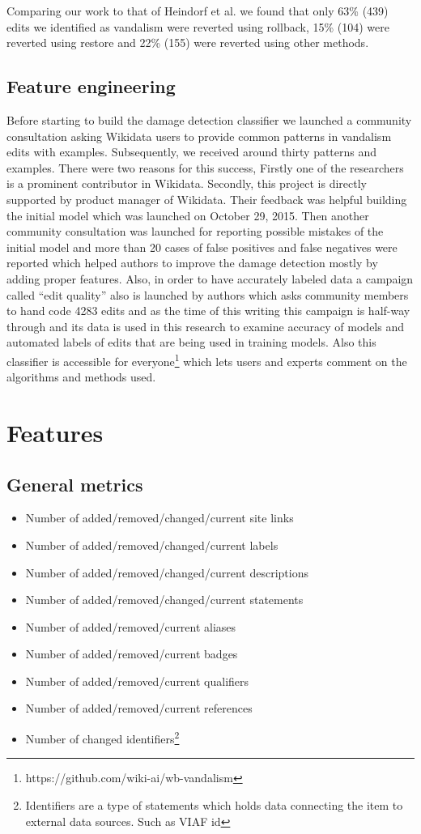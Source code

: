 \documentclass{sig-alternate}
\begin{document}
Comparing our work to that of Heindorf et al.\cite{heindorf:towards} we found that only 63\% (439) edits we identified as vandalism were reverted using rollback, 15\% (104) were reverted using restore and 22\% (155) were reverted using other methods.

\subsection{Feature engineering}
Before starting to build the damage detection classifier we launched a community consultation asking Wikidata users to provide common patterns in vandalism edits with examples. Subsequently, we received around thirty patterns and examples. There were two reasons for this success, Firstly one of the researchers is a prominent contributor in Wikidata. Secondly, this project is directly supported by product manager of Wikidata. Their feedback was helpful building the initial model which was launched on October 29, 2015. Then another community consultation was launched for reporting possible mistakes of the initial model and more than 20 cases of false positives and false negatives were reported which helped authors to improve the damage detection mostly by adding proper features. Also, in order to have accurately labeled data a campaign called ``edit quality'' also is launched by authors which asks community members to hand code 4283 edits and as the time of this writing this campaign is half-way through and its data is used in this research to examine accuracy of models and automated labels of edits that are being used in training models. Also this classifier is accessible for everyone\footnote{https://github.com/wiki-ai/wb-vandalism} which lets users and experts comment on the algorithms and methods used.

\section{Features}
\subsection{General metrics}
\begin{itemize}
\item Number of added/removed/changed/current site links
\item Number of added/removed/changed/current labels
\item Number of added/removed/changed/current descriptions
\item Number of added/removed/changed/current statements
\item Number of added/removed/current aliases
\item Number of added/removed/current badges
\item Number of added/removed/current qualifiers
\item Number of added/removed/current references
\item Number of changed identifiers\footnote{Identifiers are a type of statements which holds data connecting the item to external data sources. Such as VIAF id}
\end{itemize}
\end{document}
